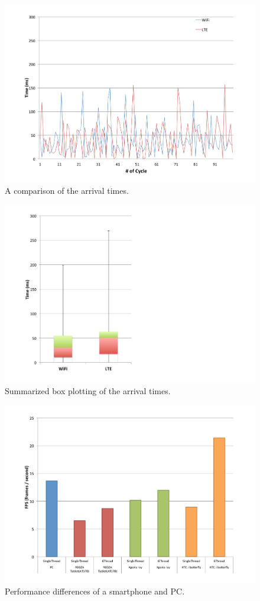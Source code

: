 \begin{figure}[!t]
 \centering
 \includegraphics[width=\hsize]{fig/No12_TIPiC_serv_cycle_compare_WiFi_and_LTE.pdf}
 \caption{A comparison of the arrival times.}
 \label{fig:no12}
\end{figure}

\begin{figure}[!t]
 \centering
 \includegraphics[width=0.5\hsize]{fig/No13_TIPiC_boxplot_compare_WiFi_and_LTE.pdf}
 \caption{Summarized box plotting of the arrival times.}
 \label{fig:no13}
\end{figure}

\begin{figure}[!t]
 \centering
 \includegraphics[width=\hsize]{fig/No14_Android_and_PC_benchmarck.pdf}
 \caption{Performance differences of a smartphone and PC.}
 \label{fig:no14}
\end{figure}
